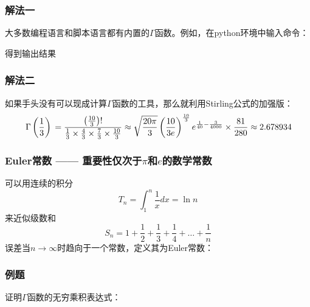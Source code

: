\documentclass[CJK,13pt]{beamer}
\begin{document}
\begin{frame}
  \frametitle{ 解法一}
  
  大多数编程语言和脚本语言都有内置的$\Gamma$函数。例如，在python环境中输入命令：

  \skipline

  
  
  得到输出结果

  \skipline
  
  \tbox
  {
  }
  
\end{frame}


\begin{frame}
  \frametitle{ 解法二}
  
  如果手头没有可以现成计算$\Gamma$函数的工具，那么就利用Stirling公式的加强版：
    {\small
    $$
      \,\Gamma\left( \frac{1}{3} \right)\, = \frac{ \left(\frac{10}{3}\right)!}{\frac{1}{3}\times \frac{4}{3} \times \frac{7}{3}\times\frac{10}{3}}  \approx \sqrt{\frac{20\pi}{3}}\left(\frac{10}{3e}\right)^{\frac{10}{3}} e^{\frac{1}{40} - \frac{3}{4000}}\times \frac{81}{280}\approx 2.678934   $$
      }
  
\end{frame}


\begin{frame}
  \frametitle{Euler常数 —— 重要性仅次于$\pi$和$e$的数学常数}
  
  可以用连续的积分$$ T_n = \int_1^{n} \frac{1}{x} dx = \ln n $$
  来近似级数和
  $$S_n = 1+\frac{1}{2}+\frac{1}{3} + \frac{1}{4} + \ldots + \frac{1}{n}$$
  误差当$n\rightarrow \infty$时趋向于一个常数，定义其为Euler常数：
  
\end{frame}


\begin{frame}
  \frametitle{例题}
  
  证明$\Gamma$函数的无穷乘积表达式：
  
\end{frame}
\end{document}
